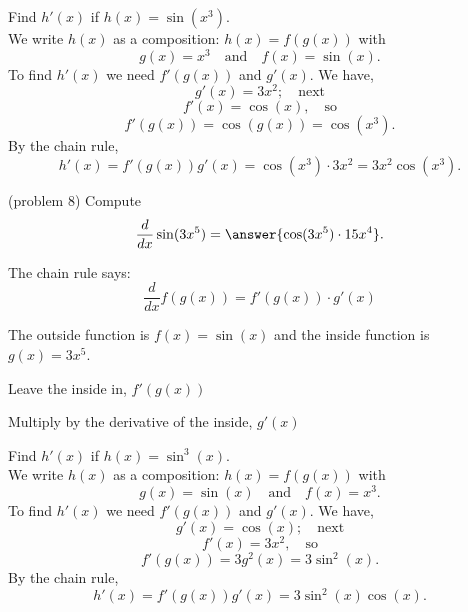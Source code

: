 \documentclass{ximera}
\begin{document}
\begin{example}[example 8]
Find $h'(x)$ if $h(x) = \sin(x^3)$.\\
We write $h(x)$ as a composition: $h(x)=f(g(x))$ with 
\[g(x) = x^3  \quad \text{and} \quad  f(x) = \sin(x).\] 
To find $h'(x)$ we need $f'(g(x))$ and $g'(x)$.  We have, 
\[g'(x) = 3x^2; \quad \text{next} \]
\[f'(x) =\cos(x) , \quad \text{so}\]
\[ f'(g(x)) = \cos(g(x)) = \cos(x^3).\]
By the chain rule,
\[h'(x) = f'(g(x))g'(x) = \cos(x^3)\cdot 3x^2 = 3x^2\cos(x^3).\]
\end{example}

\begin{center}
\begin{foldable}
\end{foldable}
\end{center}


\begin{problem}(problem 8)
  Compute
  \[
  \frac{d}{dx} \sin(3x^5) = \answer{\cos(3x^5)\cdot 15x^4}.
  \]
  
    \begin{hint}
      The chain rule says:
      \[
      \frac{d}{dx} f(g(x)) = f'(g(x))\cdot g'(x)
      \]
    \end{hint}
    \begin{hint}
      The outside function is $f(x) = \sin(x)$ and the inside
      function is $g(x) = 3x^5$.
    \end{hint}
    \begin{hint}
		  Leave the inside in, $f'(g(x))$
		\end{hint}
		\begin{hint}
		  Multiply by the derivative of the inside, $g'(x)$
		\end{hint}
    
\end{problem}



\begin{example}[example 9]
Find $h'(x)$ if $h(x) = \sin^3(x)$.\\
We write $h(x)$ as a composition: $h(x)=f(g(x))$ with 
\[g(x) =\sin(x)   \quad \text{and} \quad  f(x) = x^3.\]
 To find $h'(x)$ we need $f'(g(x))$ and $g'(x)$.  We have, 
\[g'(x) =\cos(x); \quad \text{next} \] 
\[f'(x) = 3x^2, \quad \text{so}\] 
\[f'(g(x)) = 3g^2(x) = 3\sin^2(x).\]
By the chain rule,
\[h'(x) = f'(g(x))g'(x) =  3\sin^2(x)\cos(x).\]
\end{example}
\end{document}
